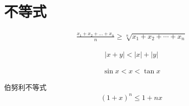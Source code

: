 \section{不等式}

\begin{align}
\frac{x_1+x_2+\dots+x_n}{n}\geqslant \sqrt[n]{x_1+x_2+\cdots+x_n}
\end{align}

\begin{align}
|x+y|<|x|+|y|
\end{align}

\begin{align}
\sin x < x < \tan x
\end{align}

伯努利不等式
\begin{align}
(1+x)^n\leqslant 1+nx
\end{align}
